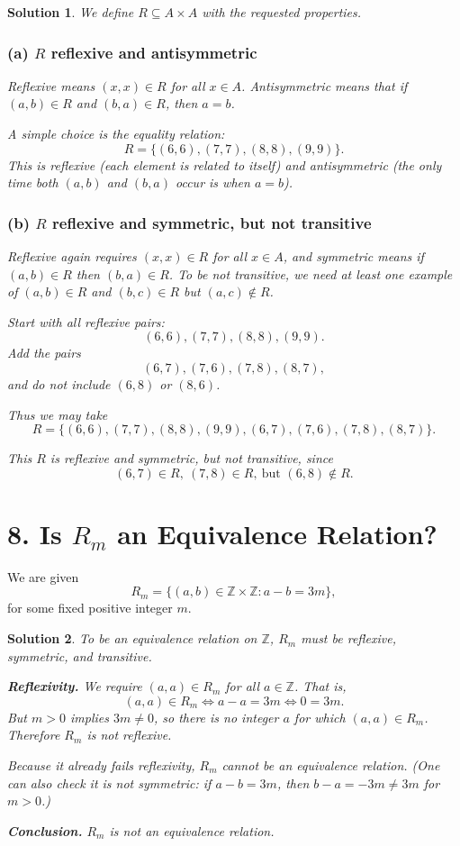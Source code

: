 \documentclass[11pt]{article}
\newtheorem*{solution}{Solution}
\begin{document}
\begin{solution}
We define $R\subseteq A\times A$ with the requested properties.

\subsubsection*{(a) $R$ reflexive and antisymmetric}
Reflexive means $(x,x)\in R$ for all $x\in A$. Antisymmetric means that if $(a,b)\in R$ and $(b,a)\in R$, then $a=b$.

A simple choice is the equality relation:
\[
R = \{(6,6), (7,7), (8,8), (9,9)\}.
\]
This is reflexive (each element is related to itself) and antisymmetric (the only time both $(a,b)$ and $(b,a)$ occur is when $a=b$).

\subsubsection*{(b) $R$ reflexive and symmetric, but not transitive}
Reflexive again requires $(x,x)\in R$ for all $x\in A$, and symmetric means if $(a,b)\in R$ then $(b,a)\in R$. To be \emph{not} transitive, we need at least one example of $(a,b)\in R$ and $(b,c)\in R$ but $(a,c)\notin R$.

Start with all reflexive pairs:
\[
(6,6), (7,7), (8,8), (9,9).
\]
Add the pairs
\[
(6,7), (7,6), (7,8), (8,7),
\]
and do \emph{not} include $(6,8)$ or $(8,6)$.

Thus we may take
\[
R = \{(6,6),(7,7),(8,8),(9,9),(6,7),(7,6),(7,8),(8,7)\}.
\]

This $R$ is reflexive and symmetric, but not transitive, since
\[
(6,7)\in R,\ (7,8)\in R,\ \text{but }(6,8)\notin R.
\]
\end{solution}

\section*{8. Is $R_m$ an Equivalence Relation?}

We are given
\[
R_m = \{(a,b)\in\mathbb{Z}\times\mathbb{Z} : a-b = 3m\},
\]
for some fixed positive integer $m$.

\begin{solution}
To be an equivalence relation on $\mathbb{Z}$, $R_m$ must be reflexive, symmetric, and transitive.

\medskip\noindent
\textbf{Reflexivity.}  
We require $(a,a)\in R_m$ for all $a\in\mathbb{Z}$. That is,
\[
(a,a)\in R_m \iff a-a = 3m \iff 0 = 3m.
\]
But $m>0$ implies $3m\neq 0$, so there is no integer $a$ for which $(a,a)\in R_m$. Therefore $R_m$ is not reflexive.

Because it already fails reflexivity, $R_m$ cannot be an equivalence relation. (One can also check it is not symmetric: if $a-b=3m$, then $b-a=-3m\neq 3m$ for $m>0$.)

\medskip\noindent
\textbf{Conclusion.} $R_m$ is \emph{not} an equivalence relation.
\end{solution}
\end{document}
